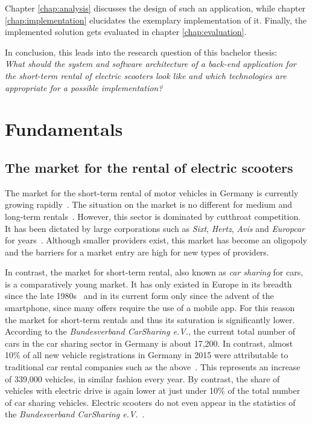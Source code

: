 \documentclass[12pt,a4paper,twoside]{report}
\begin{document}
Chapter \ref{chap:analysis} discusses the design of such an application,
while chapter \ref{chap:implementation} elucidates the exemplary implementation of it.
Finally, the implemented solution gets evaluated in chapter \ref{chap:evaluation}.

In conclusion, this leads into the research question of this bachelor thesis:\\
\emph{What should the system and software architecture of a back-end application
for the short-term rental of electric scooters look like and which
technologies are appropriate for a possible implementation?}



\chapter{Fundamentals} \label{chap:fundamentals}



\section{The market for the rental of electric scooters} \label{sect:electric-scooter-market}

The market for the short-term rental of motor vehicles in Germany
is currently growing rapidly~\cite{bundesverband-carsharing-statistics}.
The situation on the market is no different for medium and long-term rentals~\cite{sparkasse-kfz-vermietung}.
However, this sector is dominated by cutthroat competition.
It has been dictated by large corporations such as \textit{Sixt}, \textit{Hertz},
\textit{Avis} and \textit{Europcar} for years~\cite{sparkasse-kfz-vermietung}.
Although smaller providers exist, this market has become an oligopoly and
the barriers for a market entry are high for new types of providers.

In contrast, the market for short-term rental, also known as \textit{car sharing} for cars,
is a comparatively young market. It has only existed in Europe in its breadth
since the late 1980s~\cite{history-of-carsharing} and in its current form
only since the advent of the smartphone, since many offers require the use of a mobile app.
For this reason the market for short-term rentals and thus its saturation is significantly lower.
According to the \textit{Bundesverband CarSharing e.V.}, the current total number of cars
in the car sharing sector in Germany is about 17,200. In contrast, almost 10\% of all
new vehicle registrations in Germany in 2015 were attributable to traditional
car rental companies such as the above~\cite{sparkasse-kfz-vermietung}.
This represents an increase of 339,000 vehicles, in similar fashion every year.
By contrast, the share of vehicles with electric drive is again lower at
just under 10\% of the total number of car sharing vehicles.
Electric scooters do not even appear in the statistics of the
\textit{Bundesverband CarSharing e.V.}~\cite{bundesverband-carsharing-statistics}.
\end{document}
